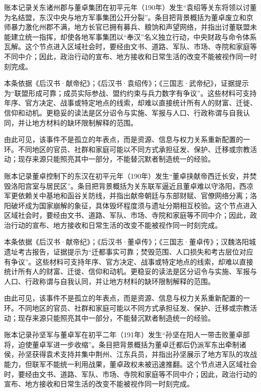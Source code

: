 账本记录关东诸州郡与董卓集团在初平元年（190年）发生“袁绍等关东将领以讨董为名结盟，东汉中央与地方军事集团公开分裂”。条目把背景概括为董卓废立和京师暴力激化州郡不满，地方长官已拥有募兵、粮饷和声望网络，并指出讨董联盟未能建立统一指挥，却使各地军事集团以“奉汉”名义独立行动，中央财政与命令体系瓦解。这个节点进入区域社会时，要经由文书、道路、军队、市场、寺院和家庭等不同中介；因此，政治行动的宣布、地方接收和日常生活的改变不能被视作同一时刻完成。

本条依据《后汉书·献帝纪》；《后汉书·袁绍传》；《三国志·武帝纪》，证据提示为“联盟形成可靠；成员实际参战、盟约约束与兵力数字有争议”。这些材料可支持年序、官方决定、战事或特定地点的线索，却难以直接统计所有人的财富、迁徙、信仰和动机。更稳妥的读法是区分诏令与实施、军报与人口、行政称谓与自我认同，并让地方材料的缺环限制解释的范围。

由此可见，该事件不是孤立的年表点，而是资源、信息与权力关系重新配置的一环。不同地区的官员、社群和家庭可能以不同方式承担征发、保护、迁移或宗教活动；现存来源只能照亮其中一部分，不能替沉默者制造统一的经验。

账本记录董卓控制下的东汉在初平元年（190年）发生“董卓挟献帝西迁长安，并焚毁洛阳宫室与居民区”。条目把背景概括为关东联军逼近且董卓难以守洛阳，西凉军更依赖关中基地和函谷关防线，并指出献帝朝廷与东部财赋、官僚网络分离；洛阳破坏成为国家崩解的象征，具体毁坏程度须与遗址分期相互校验。这个节点进入区域社会时，要经由文书、道路、军队、市场、寺院和家庭等不同中介；因此，政治行动的宣布、地方接收和日常生活的改变不能被视作同一时刻完成。

本条依据《后汉书·献帝纪》；《后汉书·董卓传》；《三国志·董卓传》；汉魏洛阳城遗址考古报告，证据提示为“迁都事实可靠；焚毁范围、人口损失和考古层位对应有争议”。这些材料可支持年序、官方决定、战事或特定地点的线索，却难以直接统计所有人的财富、迁徙、信仰和动机。更稳妥的读法是区分诏令与实施、军报与人口、行政称谓与自我认同，并让地方材料的缺环限制解释的范围。

由此可见，该事件不是孤立的年表点，而是资源、信息与权力关系重新配置的一环。不同地区的官员、社群和家庭可能以不同方式承担征发、保护、迁移或宗教活动；现存来源只能照亮其中一部分，不能替沉默者制造统一的经验。

账本记录孙坚军与董卓军在初平二年（191年）发生“孙坚在阳人一带击败董卓部将，迫使董卓军进一步收缩”。条目把背景概括为董卓迁都后仍派军东出牵制诸侯，孙坚获得袁术支持并集中荆州、江东兵员，并指出孙坚展示了地方军队的攻战能力，但联军不能统一利用战果，董卓政权未被迅速推翻。这个节点进入区域社会时，要经由文书、道路、军队、市场、寺院和家庭等不同中介；因此，政治行动的宣布、地方接收和日常生活的改变不能被视作同一时刻完成。

